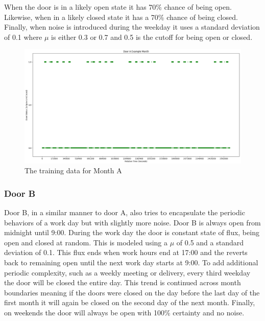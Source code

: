   When the door is in a likely open state it has 70\% chance of being open.
  Likewise, when in a likely closed state it has a 70\% chance of being closed.
  Finally, when noise is introduced during the weekday it uses a standard deviation
  of 0.1 where $\mu$ is either 0.3 or 0.7 and 0.5 is the cutoff for being open or
  closed. \\

  \begin{figure}[!htb]
    \centering
    \includegraphics[width=\linewidth]{images/Door_A_Example_Month.png}
    \caption{The training data for Month A}
    \label{figure:Door A Training Month}
  \end{figure}

  \subsubsection{ Door B }

  Door B, in a similar manner to door A, also tries to encapsulate the periodic
  behaviors of a work day but with slightly more noise. Door B is always open
  from midnight until 9:00. During the work day
  the door is constant state of flux, being open and closed at random. This is
  modeled using a $\mu$ of 0.5 and a standard deviation of 0.1. This flux ends when
  work hours end at 17:00 and the reverts back to remaining open until
  the next work day starts at 9:00. To add additional periodic complexity, such as a
  weekly meeting or delivery, every third weekday the door will be closed the
  entire day. This trend is continued across month boundaries meaning if
  the doors were closed on the day before the last day of the first month it
  will again be closed on the second day of the next month. Finally, on
  weekends the door will always be open with 100\% certainty and no noise. \\

